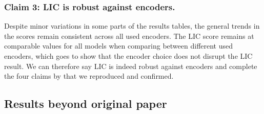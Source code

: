 \subsubsection{Claim 3: LIC is robust against encoders.}
Despite minor variations in some parts of the results tables, the general trends in the scores remain consistent across all used encoders. The LIC score remains at comparable values for all models when comparing between different used encoders, which goes to show that the encoder choice does not disrupt the LIC result. We can therefore say LIC is indeed robust against encoders and complete the four claims by \citeauthor{hirota} that we reproduced and confirmed.



\subsection{Results beyond original paper} 
